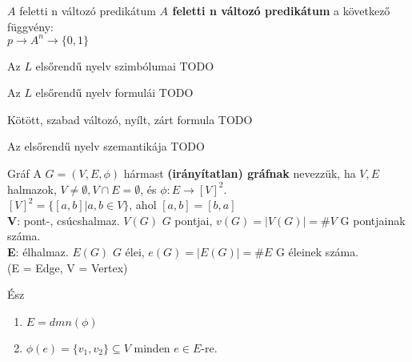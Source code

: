 \documentclass{beamer}
\begin{document}
\begin{frame}

\begin{block}{$A$ feletti n változó predikátum}
\textbf{$A$ feletti n változó predikátum} a következő függvény:\\
$p \rightarrow A^n \rightarrow \{0, 1\}$
\end{block}

\begin{block}{Az $L$ elsőrendű nyelv szimbólumai}
TODO
\end{block}

\begin{block}{Az $L$ elsőrendű nyelv formulái}
TODO
\end{block}

\begin{block}{Kötött, szabad változó, nyílt, zárt formula}
TODO
\end{block}

\begin{block}{Az elsőrendű nyelv szemantikája}
TODO
\end{block}

\end{frame}


\begin{frame}[plain]
\end{frame}


\begin{frame}

\begin{block}{Gráf}
A $G = (V, E, {\phi})$ hármast \textbf{(irányítatlan) gráfnak} nevezzük, ha $V, E$ halmazok, $V \neq \emptyset, V \cap E = \emptyset$, és $\phi : E \rightarrow [V]^2$.\\
\bigskip
$[V]^2 = \{ [a, b] | a, b \in V \}$, ahol $[a, b] = [b, a]$\\
\bigskip
\textbf{V}: pont-, csúcshalmaz. $V(G)$ $G$ pontjai, $v(G) = |V(G)| = \#V$ G pontjainak száma.\\
\bigskip
\textbf{E}: élhalmaz. $E(G)$ $G$ élei, $e(G) = |E(G)| = \#E$ G éleinek száma.\\
\bigskip
(E = Edge, V = Vertex)
\end{block}

\begin{block}{Ész}
\begin{enumerate}
\item $E = dmn({\phi})$
\item ${\phi}(e) = \{v_1, v_2\} \subseteq V$ minden $e \in E$-re.
\end{enumerate}
\end{block}

\end{frame}
\end{document}
